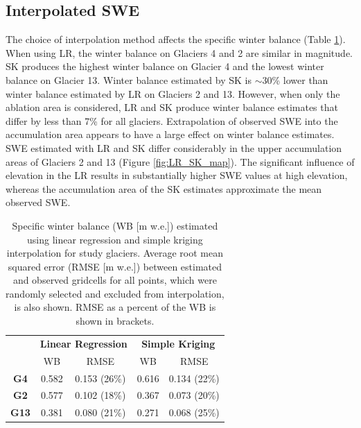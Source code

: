 \documentclass[twocolumn, letterpaper]{igs}
\begin{document}
\subsection{Interpolated SWE}
 
The choice of interpolation method affects the specific winter balance (Table \ref{tab:WSMB&RMSE}). When using LR, the winter balance on Glaciers 4 and 2 are similar in magnitude. SK produces the highest winter balance on Glacier 4 and the lowest winter balance on Glacier 13. Winter balance estimated by SK is $\sim$30\% lower than winter balance estimated by LR on Glaciers 2 and 13. However, when only the ablation area is considered, LR and SK produce winter balance estimates that differ by less than 7\% for all glaciers. Extrapolation of observed SWE into the accumulation area appears to have a large effect on winter balance estimates. SWE estimated with LR and SK differ considerably in the upper accumulation areas of Glaciers 2 and 13 (Figure \ref{fig:LR_SK_map}). The significant influence of elevation in the LR results in substantially higher SWE values at high elevation, whereas the accumulation area of the SK estimates approximate the mean observed SWE.

\begin{table}[]
\centering
\caption{Specific winter balance (WB [m w.e.]) estimated using linear regression and simple kriging interpolation for study glaciers. Average root mean squared error (RMSE [m w.e.]) between estimated and observed gridcells for all points, which were randomly selected and excluded from interpolation, is also shown. RMSE as a percent of the WB is shown in brackets.}
\label{tab:WSMB&RMSE}
\begin{tabular}{ccccc}
 & \multicolumn{2}{c}{\textbf{Linear Regression}} & \multicolumn{2}{c}{\textbf{Simple Kriging}} \\
 & WB & RMSE & WB & RMSE \\
  \midrule
\textbf{G4} & 0.582 & 0.153 (26\%) & 0.616 & 0.134 (22\%) \\
 \midrule
\textbf{G2} & 0.577 & 0.102 (18\%) & 0.367 & 0.073 (20\%) \\
 \midrule
\textbf{G13} & 0.381 & 0.080 (21\%) & 0.271 & 0.068 (25\%)
\end{tabular}
\end{table}
\end{document}
